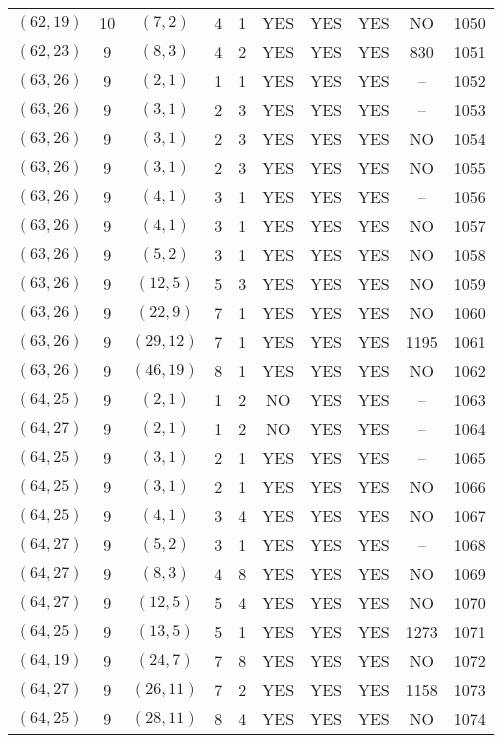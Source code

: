 \begin{longtable}{|c|c|c|c|c|c|c|c|c|c|}
$(62, 19)$ & 10 & $(7, 2)$ & 4 & 1 & YES & YES & YES & NO & 1050\\
$(62, 23)$ & 9 & $(8, 3)$ & 4 & 2 & YES & YES & YES & 830 & 1051\\
$(63, 26)$ & 9 & $(2, 1)$ & 1 & 1 & YES & YES & YES & -- & 1052\\
$(63, 26)$ & 9 & $(3, 1)$ & 2 & 3 & YES & YES & YES & -- & 1053\\
$(63, 26)$ & 9 & $(3, 1)$ & 2 & 3 & YES & YES & YES & NO & 1054\\
$(63, 26)$ & 9 & $(3, 1)$ & 2 & 3 & YES & YES & YES & NO & 1055\\
$(63, 26)$ & 9 & $(4, 1)$ & 3 & 1 & YES & YES & YES & -- & 1056\\
$(63, 26)$ & 9 & $(4, 1)$ & 3 & 1 & YES & YES & YES & NO & 1057\\
$(63, 26)$ & 9 & $(5, 2)$ & 3 & 1 & YES & YES & YES & NO & 1058\\
$(63, 26)$ & 9 & $(12, 5)$ & 5 & 3 & YES & YES & YES & NO & 1059\\
$(63, 26)$ & 9 & $(22, 9)$ & 7 & 1 & YES & YES & YES & NO & 1060\\
$(63, 26)$ & 9 & $(29, 12)$ & 7 & 1 & YES & YES & YES & 1195 & 1061\\
$(63, 26)$ & 9 & $(46, 19)$ & 8 & 1 & YES & YES & YES & NO & 1062\\
$(64, 25)$ & 9 & $(2, 1)$ & 1 & 2 & NO & YES & YES & -- & 1063\\
$(64, 27)$ & 9 & $(2, 1)$ & 1 & 2 & NO & YES & YES & -- & 1064\\
$(64, 25)$ & 9 & $(3, 1)$ & 2 & 1 & YES & YES & YES & -- & 1065\\
$(64, 25)$ & 9 & $(3, 1)$ & 2 & 1 & YES & YES & YES & NO & 1066\\
$(64, 25)$ & 9 & $(4, 1)$ & 3 & 4 & YES & YES & YES & NO & 1067\\
$(64, 27)$ & 9 & $(5, 2)$ & 3 & 1 & YES & YES & YES & -- & 1068\\
$(64, 27)$ & 9 & $(8, 3)$ & 4 & 8 & YES & YES & YES & NO & 1069\\
$(64, 27)$ & 9 & $(12, 5)$ & 5 & 4 & YES & YES & YES & NO & 1070\\
$(64, 25)$ & 9 & $(13, 5)$ & 5 & 1 & YES & YES & YES & 1273 & 1071\\
$(64, 19)$ & 9 & $(24, 7)$ & 7 & 8 & YES & YES & YES & NO & 1072\\
$(64, 27)$ & 9 & $(26, 11)$ & 7 & 2 & YES & YES & YES & 1158 & 1073\\
$(64, 25)$ & 9 & $(28, 11)$ & 8 & 4 & YES & YES & YES & NO & 1074\\

\end{longtable}
